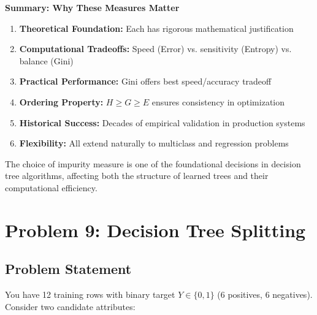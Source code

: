 \documentclass[12pt]{article}
\begin{document}
\begin{explanation}
\textbf{Summary: Why These Measures Matter}

\begin{enumerate}
    \item \textbf{Theoretical Foundation:} Each has rigorous mathematical justification
    \item \textbf{Computational Tradeoffs:} Speed (Error) vs. sensitivity (Entropy) vs. balance (Gini)
    \item \textbf{Practical Performance:} Gini offers best speed/accuracy tradeoff
    \item \textbf{Ordering Property:} $H \geq G \geq E$ ensures consistency in optimization
    \item \textbf{Historical Success:} Decades of empirical validation in production systems
    \item \textbf{Flexibility:} All extend naturally to multiclass and regression problems
\end{enumerate}

The choice of impurity measure is one of the foundational decisions in decision tree algorithms, affecting both the structure of learned trees and their computational efficiency.
\end{explanation}

\newpage

\section{Problem 9: Decision Tree Splitting}

\subsection{Problem Statement}

You have 12 training rows with binary target $Y\in\{0,1\}$ (6 positives, 6 negatives). Consider two candidate attributes:
\end{document}
